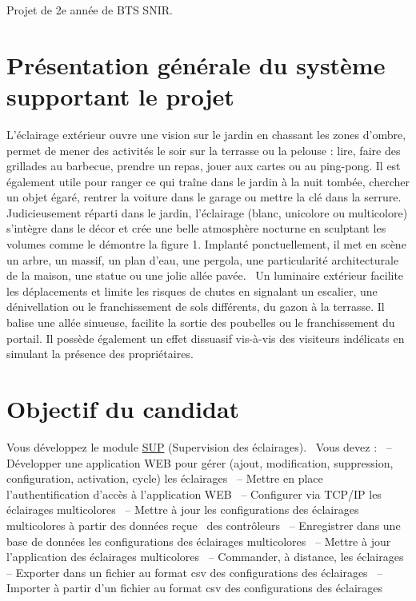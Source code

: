 Projet de 2e année de B\+TS S\+N\+IR.



\section*{Présentation générale du système supportant le projet}

L’éclairage extérieur ouvre une vision sur le jardin en chassant les zones d’ombre, permet de mener des activités le soir sur la terrasse ou la pelouse \+: lire, faire des grillades au barbecue, prendre un repas, jouer aux cartes ou au ping-\/pong. Il est également utile pour ranger ce qui traîne dans le jardin à la nuit tombée, chercher un objet égaré, rentrer la voiture dans le garage ou mettre la clé dans la serrure. Judicieusement réparti dans le jardin, l’éclairage (blanc, unicolore ou multicolore) s’intègre dans le décor et crée une belle atmosphère nocturne en sculptant les volumes comme le démontre la figure 1. Implanté ponctuellement, il met en scène un arbre, un massif, un plan d’eau, une pergola, une particularité architecturale de la maison, une statue ou une jolie allée pavée.~\newline
 Un luminaire extérieur facilite les déplacements et limite les risques de chutes en signalant un escalier, une dénivellation ou le franchissement de sols différents, du gazon à la terrasse. Il balise une allée sinueuse, facilite la sortie des poubelles ou le franchissement du portail. Il possède également un effet dissuasif vis-\/à-\/vis des visiteurs indélicats en simulant la présence des propriétaires.

\section*{Objectif du candidat}

Vous développez le module \textquotesingle{}\hyperlink{classSUP}{S\+UP}\textquotesingle{} (Supervision des éclairages).~\newline
 Vous devez \+:~\newline
 – Développer une application W\+EB pour gérer (ajout, modification, suppression, configuration, activation, cycle) les éclairages~\newline
 – Mettre en place l’authentification d’accès à l’application W\+EB~\newline
 – Configurer via T\+C\+P/\+IP les éclairages multicolores~\newline
 – Mettre à jour les configurations des éclairages multicolores à partir des données reçue~\newline
 des contrôleurs~\newline
 – Enregistrer dans une base de données les configurations des éclairages multicolores~\newline
 – Mettre à jour l’application des éclairages multicolores~\newline
 – Commander, à distance, les éclairages~\newline
 – Exporter dans un fichier au format csv des configurations des éclairages~\newline
 – Importer à partir d’un fichier au format csv des configurations des éclairages~\newline
 
